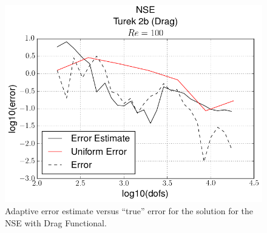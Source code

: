 \begin{test}
    \begin{figure}[h]
        \centering
        \includegraphics[scale=0.5]{Figures/AdaptiveNSEDragRe100.png}
        \caption{Adaptive error estimate versus ``true'' error for the solution
            for the NSE with Drag Functional.}
        \label{fig:NSEDrag_err}
    \end{figure}
\end{test}

